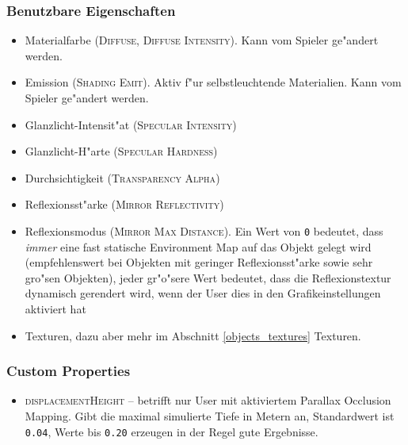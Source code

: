 \documentclass[a4paper]{article}
\newcommand{\ccaption}[1]{\textsc{#1}}
\newcommand{\cvalue}[1]{\texttt{#1}}
\newcommand{\rarrow}{\textrightarrow}
\begin{document}
\subsubsection{Benutzbare Eigenschaften}
\begin{itemize}
\item Materialfarbe (\ccaption{Diffuse}, \ccaption{Diffuse \rarrow Intensity}). Kann vom Spieler ge"andert werden.
\item Emission (\ccaption{Shading \rarrow Emit}). Aktiv f"ur selbstleuchtende Materialien. Kann vom Spieler ge"andert werden.
\item Glanzlicht-Intensit"at (\ccaption{Specular \rarrow Intensity})
\item Glanzlicht-H"arte (\ccaption{Specular \rarrow Hardness})
\item Durchsichtigkeit (\ccaption{Transparency \rarrow Alpha})
\item Reflexionsst"arke (\ccaption{Mirror \rarrow Reflectivity})
\item Reflexionsmodus (\ccaption{Mirror \rarrow Max Distance}). Ein Wert von \cvalue{0} bedeutet, dass \emph{immer} eine fast statische Environment Map
  auf das Objekt gelegt wird (empfehlenswert bei Objekten mit geringer Reflexionsst"arke sowie sehr gro"sen Objekten), jeder gr"o"sere Wert bedeutet, dass
  die Reflexionstextur dynamisch gerendert wird, wenn der User dies in den Grafikeinstellungen aktiviert hat
\item Texturen, dazu aber mehr im Abschnitt \ref{objects_textures} Texturen.
\end{itemize}

\subsubsection{Custom Properties}
\begin{itemize}
\item \ccaption{displacementHeight} -- betrifft nur User mit aktiviertem Parallax Occlusion Mapping. Gibt die maximal simulierte Tiefe in Metern an,
      Standardwert ist \cvalue{0.04}, Werte bis \cvalue{0.20} erzeugen in der Regel gute Ergebnisse.
\end{itemize}
\end{document}
